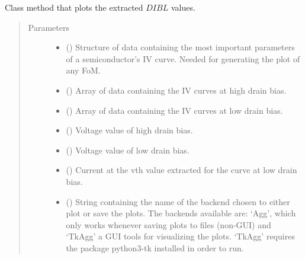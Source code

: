 \documentclass[letterpaper,10pt,english,openany, oneside]{sphinxmanual}
\begin{document}
\begin{fulllineitems}
\begin{fulllineitems}
\end{fulllineitems}


\begin{fulllineitems}
\label{\detokenize{index:fompy.fom.dibl_ext.plot}}
Class method that plots the extracted \(DIBL\) values.
\begin{quote}\begin{description}
\item[{Parameters}] \leavevmode\begin{itemize}
\item {} 
 () \textendash{} Structure of data containing the most important parameters of a semiconductor’s IV curve.
Needed for generating the plot of any FoM.

\item {} 
 () \textendash{} Array of data containing the IV curves at high drain bias.

\item {} 
 () \textendash{} Array of data containing the IV curves at low drain bias.

\item {} 
 () \textendash{} Voltage value of high drain bias.

\item {} 
 () \textendash{} Voltage value of low drain bias.

\item {} 
 () \textendash{} Current at the vth value extracted for the curve at low drain bias.

\item {} 
 () \textendash{} String containing the name of the backend chosen to either plot or save the plots. The backends available are:
‘Agg’, which only works whenever saving plots to files (non-GUI) and ‘TkAgg’ a GUI tools for visualizing the plots.
‘TkAgg’ requires the package python3-tk installed in order to run.


\end{itemize}
\end{description}
\end{quote}
\end{fulllineitems}
\end{fulllineitems}
\end{document}
